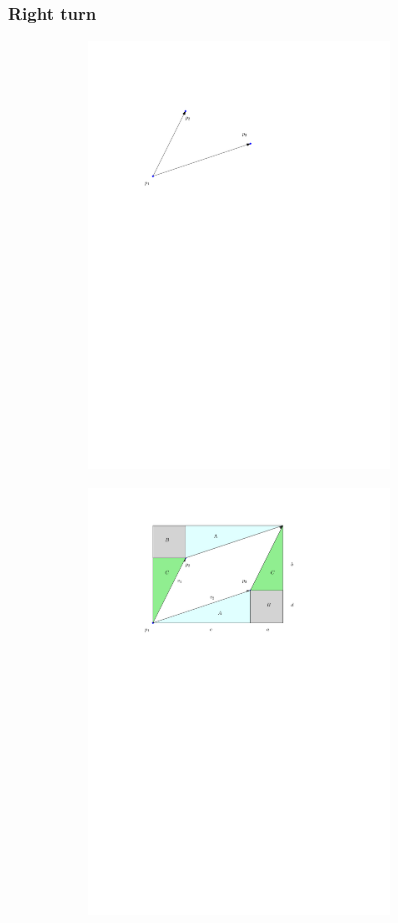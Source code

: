 \subsubsection{Right turn}
\begin{figure}[H]
	\caption{Right turn}
    \centering
	\begin{subfigure}{.7\textwidth}
		\includegraphics[width=8cm]{figures/rightturn1.pdf}
		\caption{}
		\label{fig:rightturn_a}
	\end{subfigure}
	\begin{subfigure}{.7\textwidth}
		\includegraphics[width=8cm]{figures/rightturn2.pdf}
		\caption{}
		\label{fig:rightturn_b}
	\end{subfigure}
\end{figure}
